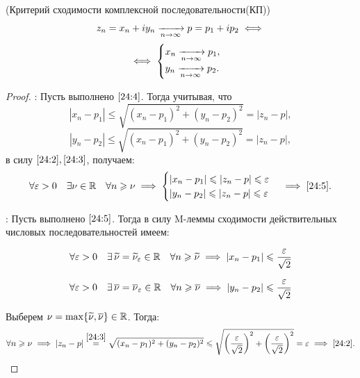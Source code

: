 \documentclass[../../main.tex]{subfiles}
\begin{document}
\begin{thm}(Критерий сходимости комплексной последовательности(КП))
	\begin{equation}\label{24:4}
		z_n = x_n + i y_n \xrightarrow[n \rightarrow \infty]{} p = p_1 + i p_2 \iff
	\end{equation}
	\begin{equation}\label{24:5}
		\iff
		\begin{cases}
			x_n \xrightarrow[n \rightarrow \infty]{} p_1, \\
			y_n \xrightarrow[n \rightarrow \infty]{} p_2.
		\end{cases}
	\end{equation}
\end{thm}
\begin{proof}
\;

	\nec: Пусть выполнено $ \eqref{24:4} $. Тогда учитывая, что
	\[|x_n - p_1| \leq \sqrt{(x_n - p_1)^2 + (y_n - p_2)^2} = |z_n - p|,\]
	\[|y_n - p_2| \leq \sqrt{(x_n - p_1)^2 + (y_n - p_2)^2} = |z_n - p|,\]
	в силу $ \eqref{24:2}, \eqref{24:3} $, получаем:	
	\[\forall \varepsilon > 0\quad \exists \nu \in \mathbb{R}\quad \forall n \geqslant \nu \implies 
	\begin{cases}
		|x_n - p_1| \leqslant |z_n - p| \leqslant \varepsilon \\
		|y_n - p_2| \leqslant |z_n - p| \leqslant \varepsilon \\
	\end{cases} \implies  \eqref{24:5}. \]
	
	\suff: Пусть выполнено $ \eqref{24:5} $. Тогда в силу  M-леммы сходимости 
	действительных числовых последовательностей имеем:
	
	\[\forall \varepsilon > 0 \quad \exists\,\widetilde{\nu} = \widetilde{\nu}_\varepsilon \in 
	\mathbb{R}\quad \forall n \geqslant \widetilde{\nu} \implies 
	|x_n - p_1| \leqslant \frac{\varepsilon}{\sqrt{2}}\]
	
	\[\forall \varepsilon > 0\quad \exists\,\overline{\nu} = \overline{\nu}_\varepsilon \in \mathbb{R}\quad 
	\forall n \geqslant \overline{\nu} \implies 
	|y_n - p_2| \leqslant \frac{\varepsilon}{\sqrt{2}} \]
	
	Выберем $ \nu = \max\{\widetilde{\nu}, \overline{\nu}\} \in \mathbb{R} $. Тогда:
	\[\forall n \geqslant \nu \implies 
	|z_n - p| \stackrel{\eqref{24:3}}{=} \sqrt{(x_n - p_1)^2 + (y_n - p_2)^2} 
	\leqslant \sqrt{\left(\frac{\varepsilon}{\sqrt{2}}\right)^2 + 
	\left(\frac{\varepsilon}{\sqrt{2}}\right)^2} = \varepsilon \implies \eqref{24:2}. \qedhere\]
\end{proof}
\end{document}
